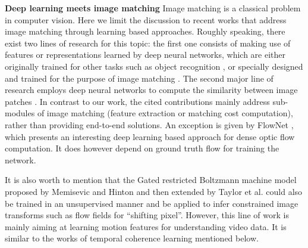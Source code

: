 \documentclass[runningheads]{llncs}
\begin{document}
	\noindent\textbf{Deep learning meets image matching} Image matching is a classical problem in computer vision. Here we limit the discussion to recent works that address image matching through learning based approaches. Roughly speaking, there exist two lines of research for this topic: the first one consists of making use of features or representations learned by deep neural networks, which are either originally trained for other tasks such as object recognition \cite{long2014convnets,fischer2014descriptor}, or specially designed and trained for the purpose of image matching \cite{huang2012learning,agrawal2015learning,simo15}. The second major line of research employs deep neural networks to compute the similarity between image patches \cite{vzbontar2014computing,park2015leveraging,zagoruyko15}. In contrast to our work, the cited contributions mainly address sub-modules of image matching (feature extraction or matching cost computation), rather than providing end-to-end solutions. An exception is given by FlowNet \cite{fischer2015flownet}, which presents an interesting deep learning based approach for dense optic flow computation. It does however depend on ground truth flow for training the network. 
	
	It is also worth to mention that the Gated restricted Boltzmann machine model proposed by Memisevic and Hinton \cite{memisevic2007unsupervised} and then extended by Taylor et al. \cite{taylor2010convolutional} could also be trained in an unsupervised manner and be applied to infer constrained image transforms such as flow fields for ``shifting pixel''. However, this line of work is mainly aiming at learning motion features for understanding video data. It is similar to the works of temporal coherence learning mentioned below.
	
\end{document}
